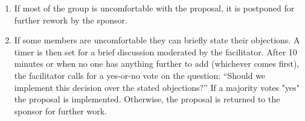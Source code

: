\begin{enumerate}
\item
  If most of the group is uncomfortable with the proposal, it is postponed for
  further rework by the sponsor.

\item
  If some members are uncomfortable they can briefly state their objections.  A
  timer is then set for a brief discussion moderated by the facilitator.  After
  10 minutes or when no one has anything further to add (whichever comes first),
  the facilitator calls for a yes-or-no vote on the question: ``Should we
  implement this decision over the stated objections?''  If a majority votes
  "yes" the proposal is implemented.  Otherwise, the proposal is returned to the
  sponsor for further work.

\end{enumerate}
